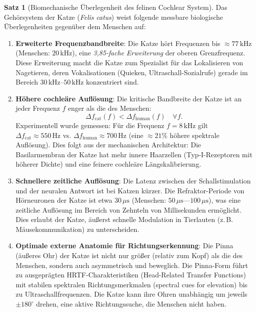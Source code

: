 ﻿\documentclass[12pt, a4paper]{article}
\theoremstyle{definition}
\newtheorem{satz}{Satz}[section]
\theoremstyle{remark}
\begin{document}
\begin{satz}[Biomechanische Überlegenheit des felinen Cochlear System]
\label{satz:feline_superiority}
Das Gehörsystem der Katze (\emph{Felis catus}) weist folgende messbare biologische Überlegenheiten gegenüber dem Menschen auf:

\begin{enumerate}

\item \textbf{Erweiterte Frequenzbandbreite}: Die Katze hört Frequenzen bis $\approx 77\,\mathrm{kHz}$ (Menschen: $20\,\mathrm{kHz}$), eine \emph{3,85-fache Erweiterung} der oberen Grenzfrequenz. Diese Erweiterung macht die Katze zum Spezialist für das Lokalisieren von Nagetieren, deren Vokalisationen (Quieken, Ultraschall-Sozialrufe) gerade im Bereich $30\,\mathrm{kHz}$--$50\,\mathrm{kHz}$ konzentriert sind.

\item \textbf{Höhere cochleäre Auflösung}: Die kritische Bandbreite der Katze ist an jeder Frequenz $f$ enger als die des Menschen:
\begin{equation}
\Delta f_{\text{cat}}(f) < \Delta f_{\text{human}}(f) \quad \forall f.
\label{eq:critical_bandwidth_comparison}
\end{equation}
Experimentell wurde gemessen: Für die Frequenz $f = 8\,\mathrm{kHz}$ gilt $\Delta f_{\text{cat}} \approx 550\,\mathrm{Hz}$ vs. $\Delta f_{\text{human}} \approx 700\,\mathrm{Hz}$ (eine $\approx 21\%$ höhere spektrale Auflösung). Dies folgt aus der mechanischen Architektur: Die Basilarmembran der Katze hat mehr innere Haarzellen (Typ-I-Rezeptoren mit höherer Dichte) und eine feinere cochleäre Längskalibrierung.

\item \textbf{Schnellere zeitliche Auflösung}: Die Latenz zwischen der Schallstimulation und der neuralen Antwort ist bei Katzen kürzer. Die Refraktor-Periode von Hörneuronen der Katze ist etwa $30\,\mu\mathrm{s}$ (Menschen: $50\,\mu\mathrm{s}$---$100\,\mu\mathrm{s}$), was eine zeitliche Auflösung im Bereich von Zehnteln von Millisekunden ermöglicht. Dies erlaubt der Katze, äußerst schnelle Modulation in Tierlauten (z.\,B. Mäusekommunikation) zu unterscheiden.

\item \textbf{Optimale externe Anatomie für Richtungserkennung}: Die Pinna (äußeres Ohr) der Katze ist nicht nur größer (relativ zum Kopf) als die des Menschen, sondern auch asymmetrisch und beweglich. Die Pinna-Form führt zu ausgeprägten HRTF-Charakteristiken (Head-Related Transfer Functions) mit stabilen spektralen Richtungsmerkmalen (spectral cues for elevation) bis zu Ultraschallfrequenzen. Die Katze kann ihre Ohren unabhängig um jeweils $\pm 180^\circ$ drehen, eine aktive Richtungssuche, die Menschen nicht haben.

\end{enumerate}
\end{satz}
\end{document}

